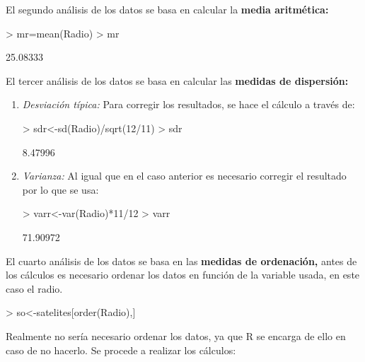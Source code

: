\documentclass [a4paper] {article}
\begin{document}
\bigskip
El segundo an\'alisis de los datos se basa en calcular la \textbf{media aritm\'etica:}
\begin{Schunk}
\begin{Sinput}
> mr=mean(Radio)
> mr
\end{Sinput}
\begin{Soutput}
[1] 25.08333
\end{Soutput}
\end{Schunk}

\bigskip
El tercer an\'alisis de los datos se basa en calcular las \textbf{medidas de dispersi\'on:}
\begin{enumerate}
\item
\textit{Desviaci\'on t\'ipica: }Para corregir los resultados, se hace el c\'alculo
a trav\'es de:
\begin{Schunk}
\begin{Sinput}
> sdr<-sd(Radio)/sqrt(12/11)
> sdr
\end{Sinput}
\begin{Soutput}
[1] 8.47996
\end{Soutput}
\end{Schunk}

\item
\textit{Varianza: }Al igual que en el caso anterior es necesario corregir el 
resultado por lo que se usa:
\begin{Schunk}
\begin{Sinput}
> varr<-var(Radio)*11/12
> varr
\end{Sinput}
\begin{Soutput}
[1] 71.90972
\end{Soutput}
\end{Schunk}
\end{enumerate}

\bigskip
El cuarto an\'alisis de los datos se basa en las \textbf{medidas de ordenaci\'on,} antes de los c\'alculos es necesario ordenar
los datos en funci\'on de la variable usada, en este caso el radio.
\begin{Schunk}
\begin{Sinput}
> so<-satelites[order(Radio),]
\end{Sinput}
\end{Schunk}

\bigskip
Realmente no ser\'ia necesario ordenar los datos, ya que R se encarga de ello
en caso de no hacerlo. Se procede a realizar los c\'alculos:
\end{document}

